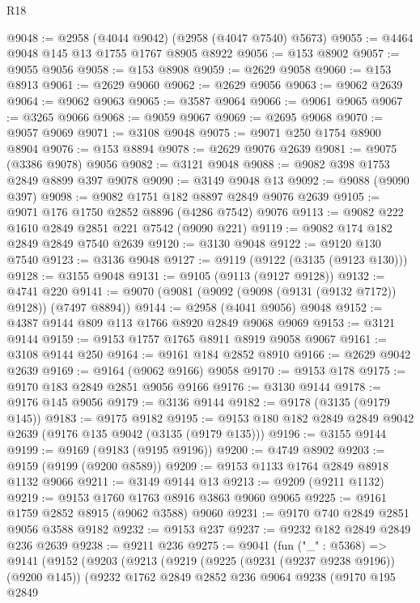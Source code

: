 \begin{lexlean}{R18}
\begin{coremodule}
@9048 := @2958 (@4044 @9042) (@2958 (@4047 @7540) @5673)
@9055 := @4464 @9048 @145 @13 @1755 @1767 @8905 @8922
@9056 := @153 @8902
@9057 := @9055 @9056
@9058 := @153 @8908
@9059 := @2629 @9058
@9060 := @153 @8913
@9061 := @2629 @9060
@9062 := @2629 @9056
@9063 := @9062 @2639
@9064 := @9062 @9063
@9065 := @3587 @9064
@9066 := @9061 @9065
@9067 := @3265 @9066
@9068 := @9059 @9067
@9069 := @2695 @9068
@9070 := @9057 @9069
@9071 := @3108 @9048
@9075 := @9071 @250 @1754 @8900 @8904
@9076 := @153 @8894
@9078 := @2629 @9076 @2639
@9081 := @9075 (@3386 @9078) @9056
@9082 := @3121 @9048
@9088 := @9082 @398 @1753 @2849 @8899 @397 @9078
@9090 := @3149 @9048 @13
@9092 := @9088 (@9090 @397)
@9098 := @9082 @1751 @182 @8897 @2849 @9076 @2639
@9105 := @9071 @176 @1750 @2852 @8896 (@4286 @7542) @9076
@9113 := @9082 @222 @1610 @2849 @2851 @221 @7542 (@9090 @221)
@9119 := @9082 @174 @182 @2849 @2849 @7540 @2639
@9120 := @3130 @9048
@9122 := @9120 @130 @7540
@9123 := @3136 @9048
@9127 := @9119 (@9122 (@3135 (@9123 @130)))
@9128 := @3155 @9048
@9131 := @9105 (@9113 (@9127 @9128))
@9132 := @4741 @220
@9141 := @9070 (@9081 (@9092 (@9098 (@9131 (@9132 @7172)) @9128)) (@7497 @8894))
@9144 := @2958 (@4041 @9056) @9048
@9152 := @4387 @9144 @809 @113 @1766 @8920 @2849 @9068 @9069
@9153 := @3121 @9144
@9159 := @9153 @1757 @1765 @8911 @8919 @9058 @9067
@9161 := @3108 @9144 @250
@9164 := @9161 @184 @2852 @8910
@9166 := @2629 @9042 @2639
@9169 := @9164 (@9062 @9166) @9058
@9170 := @9153 @178
@9175 := @9170 @183 @2849 @2851 @9056 @9166
@9176 := @3130 @9144
@9178 := @9176 @145 @9056
@9179 := @3136 @9144
@9182 := @9178 (@3135 (@9179 @145))
@9183 := @9175 @9182
@9195 := @9153 @180 @182 @2849 @2849 @9042 @2639 (@9176 @135 @9042 (@3135 (@9179 @135)))
@9196 := @3155 @9144
@9199 := @9169 (@9183 (@9195 @9196))
@9200 := @4749 @8902
@9203 := @9159 (@9199 (@9200 @8589))
@9209 := @9153 @1133 @1764 @2849 @8918 @1132 @9066
@9211 := @3149 @9144 @13
@9213 := @9209 (@9211 @1132)
@9219 := @9153 @1760 @1763 @8916 @3863 @9060 @9065
@9225 := @9161 @1759 @2852 @8915 (@9062 @3588) @9060
@9231 := @9170 @740 @2849 @2851 @9056 @3588 @9182
@9232 := @9153 @237
@9237 := @9232 @182 @2849 @2849 @236 @2639
@9238 := @9211 @236
@9275 := @9041
    (fun ("_" : @5368) =>
    @9141
      (@9152
        (@9203
          (@9213
            (@9219
              (@9225 (@9231 (@9237 @9238 @9196)) (@9200 @145))
              (@9232
                @1762
                @2849
                @2852
                @236
                @9064
                @9238
                (@9170
                  @195
                  @2849

\end{coremodule}
\end{lexlean}
